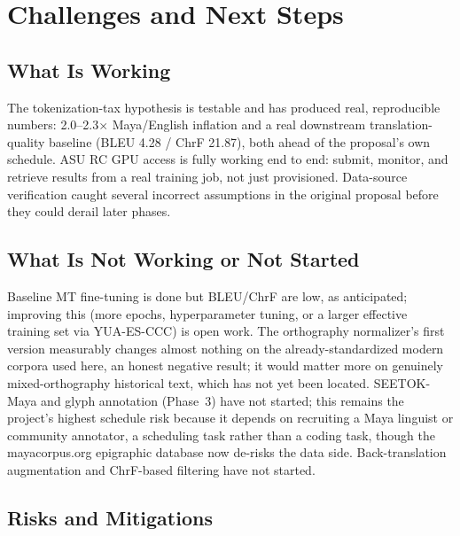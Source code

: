 \documentclass[11pt]{article}
\begin{document}
\section{Challenges and Next Steps}
\label{sec:challenges}

\subsection{What Is Working}
The tokenization-tax hypothesis is testable and has produced real,
reproducible numbers: 2.0--2.3$\times$ Maya/English inflation and a real
downstream translation-quality baseline (BLEU 4.28 / ChrF 21.87), both ahead
of the proposal's own schedule. ASU RC GPU access is fully working end to
end: submit, monitor, and retrieve results from a real training job, not just
provisioned. Data-source verification caught several incorrect assumptions in
the original proposal before they could derail later phases.

\subsection{What Is Not Working or Not Started}
Baseline MT fine-tuning is done but BLEU/ChrF are low, as anticipated;
improving this (more epochs, hyperparameter tuning, or a larger effective
training set via YUA-ES-CCC) is open work. The orthography normalizer's
first version measurably changes almost nothing on the already-standardized
modern corpora used here, an honest negative result; it would matter more on
genuinely mixed-orthography historical text, which has not yet been located.
SEETOK-Maya and glyph annotation (Phase~3) have not started; this remains the
project's highest schedule risk because it depends on recruiting a Maya
linguist or community annotator, a scheduling task rather than a coding task,
though the mayacorpus.org epigraphic database now de-risks the data side.
Back-translation augmentation and ChrF-based filtering have not started.

\subsection{Risks and Mitigations}
\end{document}
